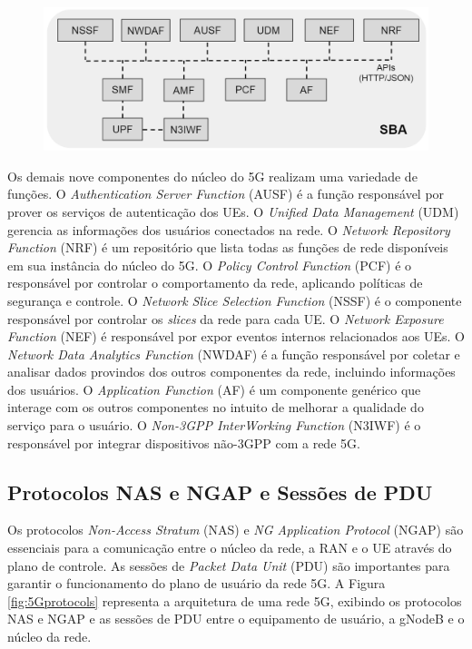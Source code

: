 \begin{figure}[!ht]
    \centering
    \includegraphics[width=1\textwidth]{TG2/Chapters/Background/Figures/Background-Core5G.png}
    \label{fig:5Gcore}
\end{figure}

Os demais nove componentes do núcleo do 5G realizam uma variedade de funções.
O \textit{Authentication Server Function} (AUSF) é a função responsável por prover os serviços de autenticação dos UEs.
O \textit{Unified Data Management} (UDM) gerencia as informações dos usuários conectados na rede.
O \textit{Network Repository Function} (NRF) é um repositório que lista todas as funções de rede disponíveis em sua instância do núcleo do 5G.
O \textit{Policy Control Function} (PCF) é o responsável por controlar o comportamento da rede, aplicando políticas de segurança e controle.
O \textit{Network Slice Selection Function} (NSSF) é o componente responsável por controlar os \textit{slices} da rede para cada UE.
O \textit{Network Exposure Function} (NEF) é responsável por expor eventos internos relacionados aos UEs.
O \textit{Network Data Analytics Function} (NWDAF) é a função responsável por coletar e analisar dados provindos dos outros componentes da rede, incluindo informações dos usuários.
O \textit{Application Function} (AF) é um componente genérico que interage com os outros componentes no intuito de melhorar a qualidade do serviço para o usuário.
O \textit{Non-3GPP InterWorking Function} (N3IWF) é o responsável por integrar dispositivos não-3GPP com a rede 5G.

\subsection{Protocolos NAS e NGAP e Sessões de PDU}

Os protocolos \textit{Non-Access Stratum} (NAS) e \textit{NG Application Protocol} (NGAP) são essenciais para a comunicação entre o núcleo da rede, a RAN e o UE através do plano de controle.
As sessões de \textit{Packet Data Unit} (PDU) são importantes para garantir o funcionamento do plano de usuário da rede 5G.
A Figura \ref{fig:5Gprotocols} representa a arquitetura de uma rede 5G, exibindo os protocolos NAS e NGAP e as sessões de PDU entre o equipamento de usuário, a gNodeB e o núcleo da rede.

